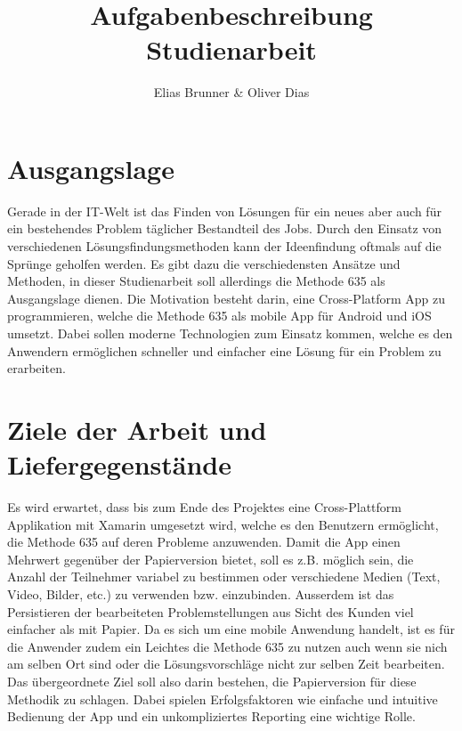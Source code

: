 \documentclass[]{article}
\title{Aufgabenbeschreibung Studienarbeit}
\author{Elias Brunner \& Oliver Dias}
\begin{document}
	
\maketitle
\section{Ausgangslage}
Gerade in der IT-Welt ist das Finden von Lösungen für ein neues aber auch für ein bestehendes Problem täglicher Bestandteil des Jobs. Durch den Einsatz von verschiedenen Lösungsfindungsmethoden kann der Ideenfindung oftmals auf die Sprünge geholfen werden. Es gibt dazu die verschiedensten Ansätze und Methoden, in dieser Studienarbeit soll allerdings die Methode 635 als Ausgangslage dienen. Die Motivation besteht darin, eine Cross-Platform App zu programmieren, welche die Methode 635 als mobile App für Android und iOS umsetzt. Dabei sollen moderne Technologien zum Einsatz kommen, welche es den Anwendern ermöglichen schneller und einfacher eine Lösung für ein Problem zu erarbeiten. 

\section{Ziele der Arbeit und Liefergegenstände}

Es wird erwartet, dass bis zum Ende des Projektes eine Cross-Plattform Applikation mit Xamarin umgesetzt wird, welche es den Benutzern ermöglicht, die Methode 635 auf deren Probleme anzuwenden. Damit die App einen Mehrwert gegenüber der Papierversion bietet, soll es z.B. möglich sein, die Anzahl der Teilnehmer variabel zu bestimmen oder verschiedene Medien (Text, Video, Bilder, etc.) zu verwenden bzw. einzubinden. Ausserdem ist das Persistieren der bearbeiteten Problemstellungen aus Sicht des Kunden viel einfacher als mit Papier.
Da es sich um eine mobile Anwendung handelt, ist es für die Anwender zudem ein Leichtes die Methode 635 zu nutzen auch wenn sie nich am selben Ort sind oder die Lösungsvorschläge nicht zur selben Zeit bearbeiten. 
Das übergeordnete Ziel soll also darin bestehen, die Papierversion für diese Methodik zu schlagen. Dabei spielen Erfolgsfaktoren wie einfache und intuitive Bedienung der App und ein unkompliziertes Reporting eine wichtige Rolle.
\end{document}
